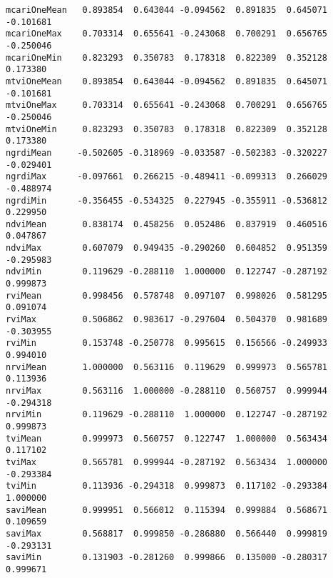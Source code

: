 \documentclass[11pt]{article}
\begin{document}
\begin{Verbatim}[commandchars=\\\{\}]
mcariOneMean   0.893854  0.643044 -0.094562  0.891835  0.645071 -0.101681
mcariOneMax    0.703314  0.655641 -0.243068  0.700291  0.656765 -0.250046
mcariOneMin    0.823293  0.350783  0.178318  0.822309  0.352128  0.173380
mtviOneMean    0.893854  0.643044 -0.094562  0.891835  0.645071 -0.101681
mtviOneMax     0.703314  0.655641 -0.243068  0.700291  0.656765 -0.250046
mtviOneMin     0.823293  0.350783  0.178318  0.822309  0.352128  0.173380
ngrdiMean     -0.502605 -0.318969 -0.033587 -0.502383 -0.320227 -0.029401
ngrdiMax      -0.097661  0.266215 -0.489411 -0.099313  0.266029 -0.488974
ngrdiMin      -0.356455 -0.534325  0.227945 -0.355911 -0.536812  0.229950
ndviMean       0.838174  0.458256  0.052486  0.837919  0.460516  0.047867
ndviMax        0.607079  0.949435 -0.290260  0.604852  0.951359 -0.295983
ndviMin        0.119629 -0.288110  1.000000  0.122747 -0.287192  0.999873
rviMean        0.998456  0.578748  0.097107  0.998026  0.581295  0.091074
rviMax         0.506862  0.983617 -0.297604  0.504370  0.981689 -0.303955
rviMin         0.153748 -0.250778  0.995615  0.156566 -0.249933  0.994010
nrviMean       1.000000  0.563116  0.119629  0.999973  0.565781  0.113936
nrviMax        0.563116  1.000000 -0.288110  0.560757  0.999944 -0.294318
nrviMin        0.119629 -0.288110  1.000000  0.122747 -0.287192  0.999873
tviMean        0.999973  0.560757  0.122747  1.000000  0.563434  0.117102
tviMax         0.565781  0.999944 -0.287192  0.563434  1.000000 -0.293384
tviMin         0.113936 -0.294318  0.999873  0.117102 -0.293384  1.000000
saviMean       0.999951  0.566012  0.115394  0.999884  0.568671  0.109659
saviMax        0.568817  0.999850 -0.286880  0.566440  0.999819 -0.293131
saviMin        0.131903 -0.281260  0.999866  0.135000 -0.280317  0.999671


\end{Verbatim}
\end{document}
